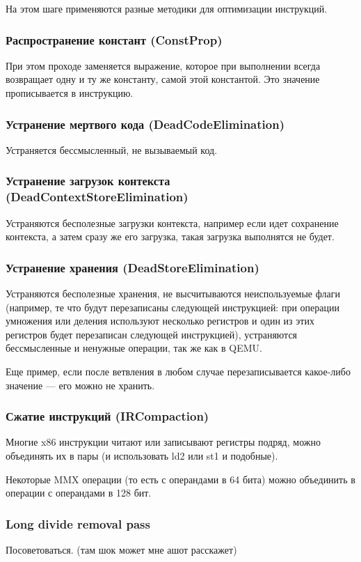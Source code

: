 На этом шаге применяются разные методики для оптимизации инструкций.

\subsubsection{Распространение констант (ConstProp)}
При этом проходе заменяется выражение, которое при выполнении всегда возвращает одну и ту же константу, самой этой константой. Это значение прописывается в инструкцию.

\subsubsection{Устранение мертвого кода (DeadCodeElimination)}
Устраняется бессмысленный, не вызываемый код.

\subsubsection{Устранение загрузок контекста (DeadContextStoreElimination)}
Устраняются бесполезные загрузки контекста, например если идет сохранение контекста, а затем сразу же его загрузка, такая загрузка выполнятся не будет. 

\subsubsection{Устранение хранения (DeadStoreElimination)}
Устраняются бесполезные хранения, не высчитываются неиспользуемые флаги (например, те что будут перезаписаны следующей инструкцией: при операции умножения или деления используют несколько регистров и один из этих регистров будет перезаписан следующей инструкцией), устраняются бессмысленные и ненужные операции, так же как в QEMU.

Еще пример, если после ветвления в любом случае перезаписывается какое-либо значение — его можно не хранить.

\subsubsection{Сжатие инструкций (IRCompaction)}
Многие x86 инструкции читают или записывают регистры подряд, можно объединять их в пары (и использовать ld2 или st1 и подобные).

Некоторые MMX операции (то есть с операндами в 64 бита) можно объединить в операции с операндами в 128 бит.

\subsubsection{Long divide removal pass}
Посоветоваться. (там шок может мне ашот расскажет)

